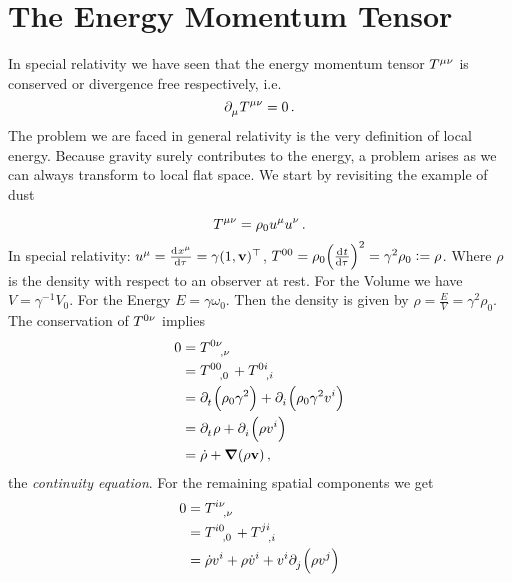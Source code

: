 \chapter{The Energy Momentum Tensor}
In special relativity we have seen that the energy momentum tensor
$\tensor{T}{^\mu^\nu}$ is conserved or divergence free respectively, i.e.
\begin{equation}
\tensor{\partial}{_\mu}\tensor{T}{^\mu^\nu}=0\,.\label{eq:EMcons}
\end{equation}
The problem we are faced in general relativity is the very definition of local
energy. Because gravity surely contributes to the energy, a problem arises
as we can always transform to local flat space.
We start by revisiting the example of dust
\begin{example}[Dust]
\begin{equation}
\tensor{T}{^\mu^\nu}=\rho_0\tensor{u}{^\mu}\tensor{u}{^\nu}\,.
\end{equation}
In special relativity:
${\tensor{u}{^\mu}=\od{\tensor{x}{^\mu}}{\tau}=\gamma(1,\vec{v})\transpose}$,
${\tensor{T}{^0^0}=\rho_0\left(\od{t}{\tau}\right)^2}=\gamma^2\rho_0:=\rho$.
Where $\rho$ is the density with respect to an observer at rest. For the Volume
we have $V=\gamma^{-1}V_0$. For the Energy $E=\gamma\omega_0$. Then the density
is given by $\rho=\frac{E}{V}=\gamma^2\rho_0$. The conservation of
$\tensor{T}{^0^\nu}$ implies
\begin{equation}
\begin{split}
0&=\tensor{T}{^0^\nu_{,\nu}}\\
&=\tensor{T}{^0^0_{,0}}+\tensor{T}{^0^i_{,i}}\\
&=\tensor{\partial}{_t}\left(\rho_0\gamma^2\right)
+\tensor{\partial}{_i}\left(\rho_0\gamma^2\tensor{v}{^i}\right)\\
&=\tensor{\partial}{_t}\rho
+\tensor{\partial}{_i}\left(\rho \tensor{v}{^i}\right)\\
&=\dot{\rho}
+\boldsymbol{\nabla}\left(\rho \vec{v}\right)\,,
\end{split}
\end{equation}
the \emph{continuity equation}. For the remaining spatial components we get
\begin{equation}
\begin{split}
0&=\tensor{T}{^i^\nu_{,\nu}}\\
&=\tensor{T}{^i^0_{,0}}+\tensor{T}{^j^i_{,i}}\\
&=\dot{\rho}\tensor{v}{^i}
+\rho\tensor{\dot{v}}{^i}
+\tensor{v}{^i}\tensor{\partial}{_j}\left(\rho\tensor{v}{^j}\right)

\end{split}
\end{equation}
\end{example}
